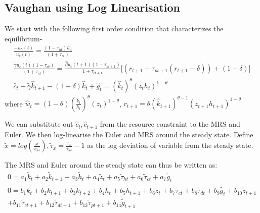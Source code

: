 \documentclass[12pt]{article}
\begin{document}
\subsection{Vaughan using Log Linearisation}
We start with the following first order condition that characterizes the equilibrium-
\begin{gather*}
 \frac{-u_h(t)}{u_c(t)} = \frac{(1-\tau_{ht})\hat{w}_t}{(1+\tau_{ct})} \\
\frac{\tilde{\gamma} u_c(t) (1-\tau_{dt})}{(1+\tau_{ct})} = \frac{\hat{\beta} u_c(t+1)(1-\tau_{dt+1})}{1+\tau_{ct+1}}\Big[(r_{t+1} - \tau_{pt+1}(r_{t+1} -\delta)) + (1-\delta) \Big]  \\
 \hat{c}_t + \tilde{\gamma} \hat{k}_{t+1} - (1-\delta)\hat{k}_t + \hat{g}_t = (\hat{k}_t)^{\theta}(z_t h_t)^{1-\theta}
\end{gather*}
where $\hat{w}_t = (1-\theta)(\frac{\hat{k}_t}{h_t})^{\theta} (z_t)^{1-\theta}$, $r_{t+1} = \theta (\hat{k}_{t+1})^{\theta -1} (z_{t+1} h_{t+1})^{1-\theta}$

We can substitute out $\hat{c}_t, \hat{c}_{t+1}$ from the resource constraint to the MRS and Euler. We then log-linearise the Euler and MRS around the steady state. Define $\tilde{x} = log(\frac{x}{x_{ss}}), \tilde{\tau}_x = \frac{\tau_x}{\tau_{ss}}-1$ as the log deviation of variable from the steady state. 




The MRS and Euler around the steady state can thus be written as:
\begin{gather*}
0 = a_1 \tilde{k}_t + a_2 \tilde{k}_{t+1} + a_3 \tilde{h}_t + a_4 \tilde{z}_t + a_5 \tilde{\tau}_{ht} + a_6 \tilde{\tau}_{ct} + a_7 \tilde{g}_t \\
0 = b_1 \tilde{k}_t + b_2 \tilde{k}_{t+1} + b_3 \tilde{k}_{t+2} + b_4\tilde{h}_t + b_5 \tilde{h}_{t+1} + b_6 \tilde{z}_t + b_7 \tilde{\tau}_{ct} + b_8 \tilde{\tau}_{dt} + b_9 \tilde{g_t} + b_{10} \tilde{z}_{t+1} \\ + b_{11} \tilde{\tau}_{ct+1} + b_{12} \tilde{\tau}_{dt+1} + b_{13} \tilde{\tau}_{pt+1} + b_{14} \tilde{g}_{t+1}
\end{gather*}
\end{document}
